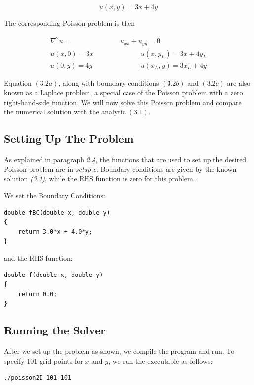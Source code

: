 \documentclass[11pt]{report}
\begin{document}
\begin{equation}
u(x,y) = 3x + 4y
\end{equation}

The corresponding Poisson problem is then

\begin{subequations}
\begin{align}
\nabla ^2 u = &u_{xx} + u_{yy} = 0 \\
u(x,0) = 3x \quad \quad \quad & \quad \quad \quad u(x,y_L) = 3x + 4y_L \\
u(0,y) = 4y \quad \quad \quad & \quad \quad \quad u(x_L,y) = 3x_L + 4y
\end{align}
\end{subequations}

Equation $(3.2a)$, along with boundary conditions $(3.2b)$ and $(3.2c)$ are also known as a Laplace problem, a special case of the Poisson problem with a zero right-hand-side function. We will now solve this Poisson problem and compare the numerical solution with the analytic $(3.1)$.

\subsection*{Setting Up The Problem}
As explained in paragraph \emph{2.4}, the functions that are used to set up the desired Poisson problem are in \emph{setup.c}. Boundary conditions are given by the known solution \emph{(3.1)}, while the RHS function is zero for this problem. 
\newline

We set the Boundary Conditions:

\begin{lstlisting}
double fBC(double x, double y) 
{
    return 3.0*x + 4.0*y;
}
\end{lstlisting}

and the RHS function:

\begin{lstlisting}
double f(double x, double y) 
{
    return 0.0;
}
\end{lstlisting}

\subsection*{Running the Solver}
After we set up the problem as shown, we compile the program and run. To specify 101 grid points for $x$ and $y$, we run the executable as follows:

\begin{lstlisting}
./poisson2D 101 101
\end{lstlisting}
\end{document}
